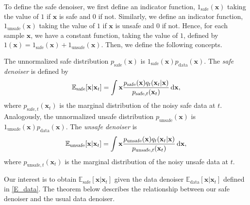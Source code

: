 %
%
%
%
%
%
%
%
%
%
%



%

To define the safe denoiser, we first define an indicator function,  $1_{\text{safe}}(\mathbf{x})$ taking the value of $1$ if $\mathbf{x}$ is safe and $0$ if not. Similarly, we define an indicator function, $1_{\text{unsafe}}(\mathbf{x})$ taking the value of $1$ if $\mathbf{x}$ is unsafe and $0$ if not. Hence, for each sample $\mathbf{x}$, we have a constant function, taking the value of $1$, defined by  $1(\mathbf{x}) = 1_{\text{safe}}(\mathbf{x}) + 1_{\text{unsafe}}(\mathbf{x})$. Then, we define the following concepts.
\begin{definition}
    The unnormalized safe distribution $p_{\text{safe}}(\mathbf{x})$ is $1_{\text{safe}}(\mathbf{x})p_{\text{data}}(\mathbf{x})$. The \textit{safe denoiser} is defined by
    \begin{align*}
    \mathbb{E}_{\text{safe}}[\mathbf{x}\vert\mathbf{x}_{t}]=\int \mathbf{x}\frac{p_{\text{safe}}(\mathbf{x})q_{t}(\mathbf{x}_{t}\vert\mathbf{x})}{p_{\text{safe},t}(\mathbf{x}_{t})}\mathop{}\!\mathrm{d}\mathbf{x},
\end{align*}
where $p_{\text{safe},t}(\mathbf{x}_{t})$ is the marginal distribution of the noisy safe data at $t$. Analogously, the unnormalized unsafe distribution $p_{\text{unsafe}}(\mathbf{x})$ is $1_{\text{unsafe}}(\mathbf{x})p_{\text{data}}(\mathbf{x})$. The \textit{unsafe denoiser} is
\begin{align}\label{eq:E_unsafe}
    \mathbb{E}_{\text{unsafe}}[\mathbf{x}\vert\mathbf{x}_{t}]=\int \mathbf{x}\frac{p_{\text{unsafe}}(\mathbf{x})q_{t}(\mathbf{x}_{t}\vert\mathbf{x})}{p_{\text{unsafe},t}(\mathbf{x}_{t})}\mathop{}\!\mathrm{d}\mathbf{x},
\end{align}
where $p_{\text{unsafe},t}(\mathbf{x}_{t})$ is the marginal distribution of the noisy unsafe data at $t$.
\end{definition}



Our interest is to obtain $\mathbb{E}_{\text{safe}}[\mathbf{x}\vert\mathbf{x}_{t}]$ given the data denoiser $\mathbb{E}_{\text{data}}[\mathbf{x}\vert\mathbf{x}_{t}]$ defined in \eqref{E_data}. The theorem below describes the relationship between our safe denoiser and the usual data denoiser.

